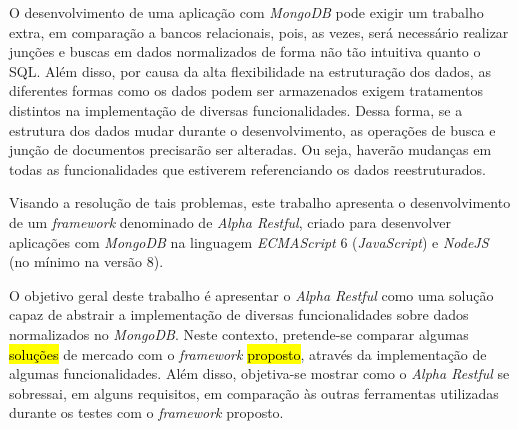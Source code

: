 O desenvolvimento de uma aplicação com \textit{MongoDB} pode exigir um trabalho extra, em comparação a bancos relacionais, pois, as vezes, será necessário realizar junções e buscas em dados normalizados de forma não tão intuitiva quanto o SQL. Além disso, por causa da alta flexibilidade na estruturação dos dados, as diferentes formas como os dados podem ser armazenados exigem tratamentos distintos na implementação de diversas funcionalidades. Dessa forma, se a estrutura dos dados mudar durante o desenvolvimento, as operações de busca e junção de documentos precisarão ser alteradas. Ou seja, haverão mudanças em todas as funcionalidades que estiverem referenciando os dados reestruturados.


Visando a resolução de tais problemas, este trabalho apresenta o desenvolvimento de um \textit{framework} denominado de \textit{Alpha Restful}, criado para desenvolver aplicações com \textit{MongoDB} na linguagem \textit{ECMAScript} 6 (\textit{JavaScript}) e \textit{NodeJS} (no mínimo na versão 8).


O objetivo geral deste trabalho é apresentar o \textit{Alpha Restful} como uma solução capaz de abstrair a implementação de diversas funcionalidades sobre dados normalizados no \textit{MongoDB}. Neste contexto, pretende-se comparar algumas \hl{soluções} de mercado com o \textit{framework} \hl{proposto}, através da implementação de algumas funcionalidades. Além disso, objetiva-se mostrar como o \textit{Alpha Restful}
se sobressai, em alguns requisitos, em comparação às outras ferramentas utilizadas durante os testes com o \textit{framework} proposto.

